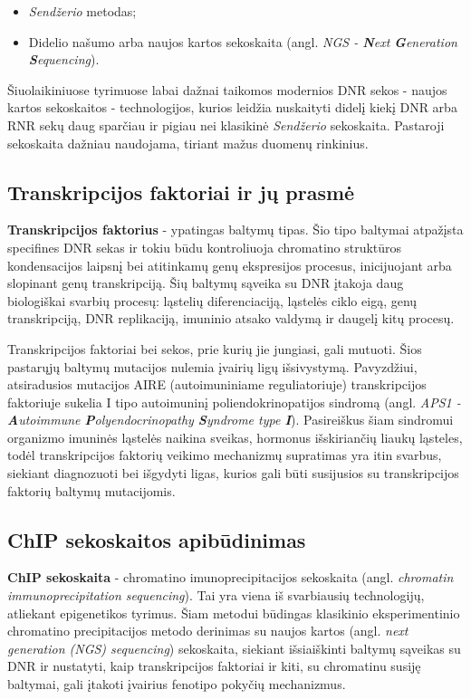 \documentclass[12pt]{article}
\begin{document}
\begin{itemize}
    \item \emph{Sendžerio} metodas;
    \item Didelio našumo arba naujos kartos sekoskaita
    (angl. \emph{NGS - \textbf{N}ext \textbf{G}eneration \textbf{S}equencing}).
\end{itemize}

Šiuolaikiniuose tyrimuose labai dažnai taikomos modernios DNR sekos - naujos 
kartos se\-kos\-kai\-tos - technologijos, kurios leidžia nuskaityti didelį kiekį
DNR arba RNR sekų daug sparčiau ir pigiau nei klasikinė \emph{Sendžerio} 
sekoskaita. Pastaroji sekoskaita dažniau naudojama, tiriant mažus duomenų
rinkinius.

\subsection{Transkripcijos faktoriai ir jų prasmė}

\textbf{Transkripcijos faktorius} - ypatingas baltymų tipas. Šio tipo baltymai
atpažįsta specifines DNR sekas ir tokiu būdu kontroliuoja chromatino struktūros
kondensacijos laipsnį bei atitinkamų genų ekspresijos procesus, inicijuojant
arba slopinant genų transkripciją. Šių baltymų sąveika su DNR įtakoja daug
biologiškai svarbių procesų: ląstelių diferenciaciją, ląstelės ciklo eigą, genų
transkripciją, DNR replikaciją, imuninio atsako valdymą ir daugelį kitų
procesų\cite{ARTICLE10, ARTICLE11}.

Transkripcijos faktoriai bei sekos, prie kurių jie jungiasi, gali
mutuoti. Šios pastarųjų baltymų mutacijos nulemia įvairių ligų išsivystymą.
Pavyzdžiui, atsiradusios mutacijos AIRE (autoimuniniame reguliatoriuje)
transkripcijos faktoriuje sukelia I tipo autoimuninį poliendokrinopatijos
sindromą\cite{ARTICLE9} (angl. \emph{APS1 - \textbf{A}utoimmune
\textbf{P}olyendocrinopathy \textbf{S}yndrome type \textbf{I}}). Pasireiškus
šiam sindromui organizmo imuninės ląstelės naikina sveikas, hormonus
išskiriančių liaukų ląsteles\cite{ASP1}, todėl transkripcijos faktorių veikimo
mechanizmų supratimas yra itin svarbus, siekiant diagnozuoti bei išgydyti ligas,
kurios gali būti susijusios su transkripcijos faktorių baltymų mutacijomis.

\subsection{ChIP sekoskaitos apibūdinimas}
\textbf{ChIP sekoskaita} - chromatino imunoprecipitacijos sekoskaita (angl.
\emph{chromatin immunoprecipitation sequencing}). Tai yra viena iš svarbiausių
technologijų, atliekant epigenetikos tyrimus\cite{ARTICLE1}. Šiam metodui
būdingas klasikinio eksperimentinio chromatino precipitacijos metodo derinimas
su naujos kartos (angl. \emph{next generation (NGS) sequencing}) sekoskaita,
siekiant išsiaiškinti baltymų sąveikas su DNR ir nustatyti, kaip transkripcijos
faktoriai ir kiti, su chromatinu susiję baltymai, gali įtakoti įvairius fenotipo
pokyčių mechanizmus\cite{ARTICLE2}.
\end{document}

